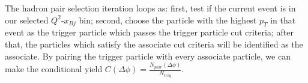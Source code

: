 The hadron pair selection iteration loops as: first, test if the current event is in
our selected $Q^{2}$-$x_{Bj}$ bin; second, choose the particle with the highest
$p_{T}$ in that event as the trigger particle which passes the trigger particle cut criteria;
after that, the particles which satisfy the associate cut criteria will be identified
as the associate. By pairing the trigger particle with every associate particle, we can
make the conditional yield $C(\Delta\phi)=\frac{N_{pair}(\Delta\phi)}{N_{trig}}$.

%


